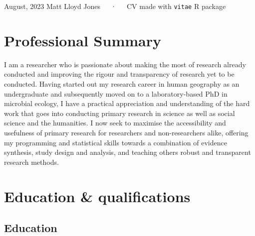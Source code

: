 \documentclass[11pt,a4paper,]{awesome-cv}
\begin{document}
\makecvheader

\makecvfooter
  {August, 2023}
    {Matt Lloyd Jones~~~·~~~CV made with \texttt{vitae} R package}
  {\thepage}





\hypertarget{professional-summary}{%
\section{Professional Summary}\label{professional-summary}}

I am a researcher who is passionate about making the most of research
already conducted and improving the rigour and transparency of research
yet to be conducted. Having started out my research career in human
geography as an undergraduate and subsequently moved on to a
laboratory-based PhD in microbial ecology, I have a practical
appreciation and understanding of the hard work that goes into
conducting primary research in science as well as social science and the
humanities. I now seek to maximise the accessibility and usefulness of
primary research for researchers and non-researchers alike, offering my
programming and statistical skills towards a combination of evidence
synthesis, study design and analysis, and teaching others robust and
transparent research methods.

\hypertarget{education-qualifications}{%
\section{Education \& qualifications}\label{education-qualifications}}

\hypertarget{education}{%
\subsection{Education}\label{education}}
\end{document}
